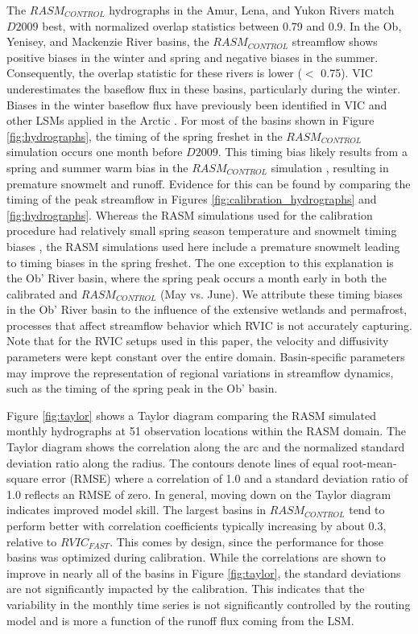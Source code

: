 \documentclass[jgrga, draft]{agutex}
\begin{document}
\begin{article}
The $RASM_{CONTROL}$ hydrographs in the Amur, Lena, and Yukon Rivers match $D2009$ best, with normalized overlap statistics between 0.79 and 0.9.
In the Ob, Yenisey, and Mackenzie River basins, the $RASM_{CONTROL}$ streamflow shows positive biases in the winter and spring and negative biases in the summer.
Consequently, the overlap statistic for these rivers is lower ($<$ 0.75).
VIC underestimates the baseflow flux in these basins, particularly during the winter.
Biases in the winter baseflow flux have previously been identified in VIC and other LSMs applied in the Arctic \citep{Slater_2007}.
For most of the basins shown in Figure \ref{fig:hydrographs}, the timing of the spring freshet in the $RASM_{CONTROL}$ simulation occurs one month before $D2009$.
This timing bias likely results from a spring and summer warm bias in the $RASM_{CONTROL}$ simulation \citep{Hamman_2016}, resulting in premature snowmelt and runoff.
Evidence for this can be found by comparing the timing of the peak streamflow in Figures \ref{fig:calibration_hydrographs} and \ref{fig:hydrographs}.
Whereas the RASM simulations used for the calibration procedure had relatively small spring season temperature and snowmelt timing biases \citep{Hamman_2016}, the RASM simulations used here include a premature snowmelt leading to timing biases in the spring freshet.
The one exception to this explanation is the Ob' River basin, where the spring peak occurs a month early in both the calibrated and $RASM_{CONTROL}$ (May vs. June).
We attribute these timing biases in the Ob' River basin to the influence of the extensive wetlands and permafrost, processes that affect streamflow behavior which RVIC is not accurately capturing.
Note that for the RVIC setups used in this paper, the velocity and diffusivity parameters were kept constant over the entire domain.
Basin-specific parameters may improve the representation of regional variations in streamflow dynamics, such as the timing of the spring peak in the Ob' basin.

Figure \ref{fig:taylor} shows a Taylor diagram comparing the RASM simulated monthly hydrographs at 51 observation locations within the RASM domain.
The Taylor diagram shows the correlation along the arc and the normalized standard deviation ratio along the radius.
The contours denote lines of equal root-mean-square error (RMSE) where a correlation of 1.0 and a standard deviation ratio of 1.0 reflects an RMSE of zero.
In general, moving down on the Taylor diagram indicates improved model skill.
The largest basins in $RASM_{CONTROL}$ tend to perform better with correlation coefficients typically increasing by about 0.3, relative to $RVIC_{FAST}$.
This comes by design, since the performance for those basins was optimized during calibration.
While the correlations are shown to improve in nearly all of the basins in Figure \ref{fig:taylor}, the standard deviations are not significantly impacted by the calibration.
This indicates that the variability in the monthly time series is not significantly controlled by the routing model and is more a function of the runoff flux coming from the LSM.


\end{article}
\end{document}

